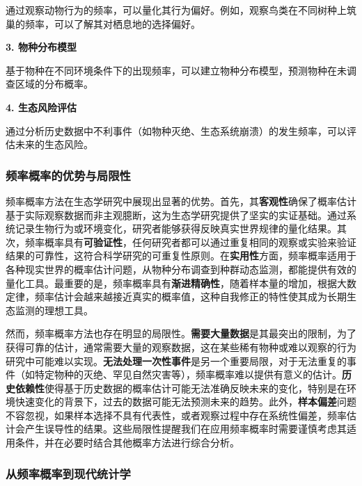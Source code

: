 \documentclass[
]{book}
\begin{document}
通过观察动物行为的频率，可以量化其行为偏好。例如，观察鸟类在不同树种上筑巢的频率，可以了解其对栖息地的选择偏好。

\textbf{3. 物种分布模型}

基于物种在不同环境条件下的出现频率，可以建立物种分布模型，预测物种在未调查区域的分布概率。

\textbf{4. 生态风险评估}

通过分析历史数据中不利事件（如物种灭绝、生态系统崩溃）的发生频率，可以评估未来的生态风险。

\hypertarget{ux9891ux7387ux6982ux7387ux7684ux4f18ux52bfux4e0eux5c40ux9650ux6027}{%
\subsubsection{频率概率的优势与局限性}\label{ux9891ux7387ux6982ux7387ux7684ux4f18ux52bfux4e0eux5c40ux9650ux6027}}

频率概率方法在生态学研究中展现出显著的优势。首先，其\textbf{客观性}确保了概率估计基于实际观察数据而非主观臆断，这为生态学研究提供了坚实的实证基础。通过系统记录生物行为或环境变化，研究者能够获得反映真实世界规律的量化结果。其次，频率概率具有\textbf{可验证性}，任何研究者都可以通过重复相同的观察或实验来验证结果的可靠性，这符合科学研究的可重复性原则。在\textbf{实用性}方面，频率概率适用于各种现实世界的概率估计问题，从物种分布调查到种群动态监测，都能提供有效的量化工具。最重要的是，频率概率具有\textbf{渐进精确性}，随着样本量的增加，根据大数定律，频率估计会越来越接近真实的概率值，这种自我修正的特性使其成为长期生态监测的理想工具。

然而，频率概率方法也存在明显的局限性。\textbf{需要大量数据}是其最突出的限制，为了获得可靠的估计，通常需要大量的观察数据，这在某些稀有物种或难以观察的行为研究中可能难以实现。\textbf{无法处理一次性事件}是另一个重要局限，对于无法重复的事件（如特定物种的灭绝、罕见自然灾害等），频率概率难以提供有意义的估计。\textbf{历史依赖性}使得基于历史数据的概率估计可能无法准确反映未来的变化，特别是在环境快速变化的背景下，过去的数据可能无法预测未来的趋势。此外，\textbf{样本偏差}问题不容忽视，如果样本选择不具有代表性，或者观察过程中存在系统性偏差，频率估计会产生误导性的结果。这些局限性提醒我们在应用频率概率时需要谨慎考虑其适用条件，并在必要时结合其他概率方法进行综合分析。

\hypertarget{ux4eceux9891ux7387ux6982ux7387ux5230ux73b0ux4ee3ux7edfux8ba1ux5b66}{%
\subsubsection{从频率概率到现代统计学}\label{ux4eceux9891ux7387ux6982ux7387ux5230ux73b0ux4ee3ux7edfux8ba1ux5b66}}
\end{document}

